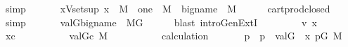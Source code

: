 \begin{isabellebody}
\ simp\isanewline
\ \ \isamarkupfalse%
\isanewline
\ \ \isamarkupfalse%
\ {\isachardoublequoteopen}{\isacharbraceleft}{\kern0pt}x{\isasymin}Vset{\isacharparenleft}{\kern0pt}{\isacharquery}{\kern0pt}sup{\isacharparenright}{\kern0pt}{\isachardot}{\kern0pt}\ x\ {\isasymin}\ M{\isacharbraceright}{\kern0pt}\ {\isasymtimes}\ {\isacharbraceleft}{\kern0pt}one{\isacharbraceright}{\kern0pt}\ {\isasymin}\ M{\isachardoublequoteclose}\ {\isacharparenleft}{\kern0pt}\ {\isachardoublequoteopen}{\isacharquery}{\kern0pt}big{\isacharunderscore}{\kern0pt}name\ {\isasymin}\ M{\isachardoublequoteclose}{\isacharparenright}{\kern0pt}\isanewline
\ \ \ \ \isamarkupfalse%
\ cartprod{\isacharunderscore}{\kern0pt}closed\ \isamarkupfalse%
\ simp\isanewline
\ \ \isamarkupfalse%
\isanewline
\ \ \isamarkupfalse%
\ {\isachardoublequoteopen}val{\isacharparenleft}{\kern0pt}G{\isacharcomma}{\kern0pt}{\isacharquery}{\kern0pt}big{\isacharunderscore}{\kern0pt}name{\isacharparenright}{\kern0pt}\ {\isasymin}\ M{\isacharbrackleft}{\kern0pt}G{\isacharbrackright}{\kern0pt}{\isachardoublequoteclose}\isanewline
\ \ \ \ \isamarkupfalse%
\ {\isacharparenleft}{\kern0pt}blast\ intro{\isacharcolon}{\kern0pt}GenExtI{\isacharparenright}{\kern0pt}\isanewline
\ \ \isacommand{{\isacharbraceleft}{\kern0pt}}\isamarkupfalse%
\isanewline
\ \ \ \ \isamarkupfalse%
\ v\ x\isanewline
\ \ \ \ \isamarkupfalse%
\ {\isachardoublequoteopen}x{\isasymin}c{\isachardoublequoteclose}\isanewline
\ \ \ \ \isamarkupfalse%
\isanewline
\ \ \ \ \isamarkupfalse%
\ {\isacartoucheopen}val{\isacharparenleft}{\kern0pt}G{\isacharcomma}{\kern0pt}{\isasympi}{\isacharprime}{\kern0pt}{\isacharparenright}{\kern0pt}{\isacharequal}{\kern0pt}c{\isacartoucheclose}\ {\isacartoucheopen}{\isasympi}{\isacharprime}{\kern0pt}{\isasymin}M{\isacartoucheclose}\isanewline
\ \ \ \ \isamarkupfalse%
\isanewline
\ \ \ \ \isamarkupfalse%
\ calculation\isanewline
\ \ \ \ \isamarkupfalse%
\ {\isasymrho}\ p\ \ {\isachardoublequoteopen}{\isasymlangle}{\isasymrho}{\isacharcomma}{\kern0pt}p{\isasymrangle}{\isasymin}{\isasympi}{\isacharprime}{\kern0pt}{\isachardoublequoteclose}\ \ {\isachardoublequoteopen}val{\isacharparenleft}{\kern0pt}G{\isacharcomma}{\kern0pt}{\isasymrho}{\isacharparenright}{\kern0pt}\ {\isacharequal}{\kern0pt}\ x{\isachardoublequoteclose}\ {\isachardoublequoteopen}p{\isasymin}G{\isachardoublequoteclose}\ {\isachardoublequoteopen}{\isasymrho}{\isasymin}M{\isachardoublequoteclose}\isanewline

\end{isabellebody}
